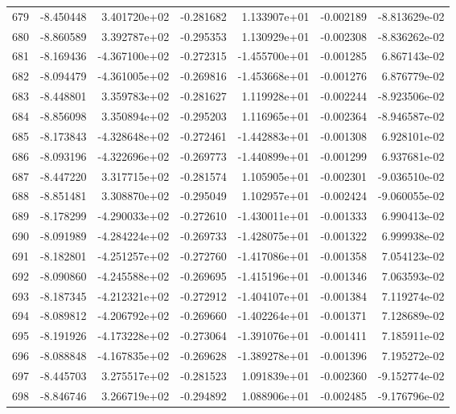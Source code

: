 \begin{tabular}{rrrrrrr}
 679 &  -8.450448 &  3.401720e+02 & -0.281682 &  1.133907e+01 &   -0.002189 & -8.813629e-02 \\
 680 &  -8.860589 &  3.392787e+02 & -0.295353 &  1.130929e+01 &   -0.002308 & -8.836262e-02 \\
 681 &  -8.169436 & -4.367100e+02 & -0.272315 & -1.455700e+01 &   -0.001285 &  6.867143e-02 \\
 682 &  -8.094479 & -4.361005e+02 & -0.269816 & -1.453668e+01 &   -0.001276 &  6.876779e-02 \\
 683 &  -8.448801 &  3.359783e+02 & -0.281627 &  1.119928e+01 &   -0.002244 & -8.923506e-02 \\
 684 &  -8.856098 &  3.350894e+02 & -0.295203 &  1.116965e+01 &   -0.002364 & -8.946587e-02 \\
 685 &  -8.173843 & -4.328648e+02 & -0.272461 & -1.442883e+01 &   -0.001308 &  6.928101e-02 \\
 686 &  -8.093196 & -4.322696e+02 & -0.269773 & -1.440899e+01 &   -0.001299 &  6.937681e-02 \\
 687 &  -8.447220 &  3.317715e+02 & -0.281574 &  1.105905e+01 &   -0.002301 & -9.036510e-02 \\
 688 &  -8.851481 &  3.308870e+02 & -0.295049 &  1.102957e+01 &   -0.002424 & -9.060055e-02 \\
 689 &  -8.178299 & -4.290033e+02 & -0.272610 & -1.430011e+01 &   -0.001333 &  6.990413e-02 \\
 690 &  -8.091989 & -4.284224e+02 & -0.269733 & -1.428075e+01 &   -0.001322 &  6.999938e-02 \\
 691 &  -8.182801 & -4.251257e+02 & -0.272760 & -1.417086e+01 &   -0.001358 &  7.054123e-02 \\
 692 &  -8.090860 & -4.245588e+02 & -0.269695 & -1.415196e+01 &   -0.001346 &  7.063593e-02 \\
 693 &  -8.187345 & -4.212321e+02 & -0.272912 & -1.404107e+01 &   -0.001384 &  7.119274e-02 \\
 694 &  -8.089812 & -4.206792e+02 & -0.269660 & -1.402264e+01 &   -0.001371 &  7.128689e-02 \\
 695 &  -8.191926 & -4.173228e+02 & -0.273064 & -1.391076e+01 &   -0.001411 &  7.185911e-02 \\
 696 &  -8.088848 & -4.167835e+02 & -0.269628 & -1.389278e+01 &   -0.001396 &  7.195272e-02 \\
 697 &  -8.445703 &  3.275517e+02 & -0.281523 &  1.091839e+01 &   -0.002360 & -9.152774e-02 \\
 698 &  -8.846746 &  3.266719e+02 & -0.294892 &  1.088906e+01 &   -0.002485 & -9.176796e-02 \\

\end{tabular}
